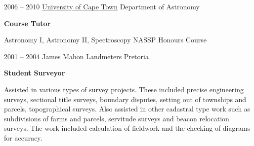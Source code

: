 \documentclass[]{friggeri-cv} %
\begin{document}
\begin{entrylist}
%
\entry
{2006 -- 2010}
{\href{http://www.uct.ac.za}{University of Cape Town}}
{Department of Astronomy}
{%
\textbf{Course Tutor}

Astronomy I, Astronomy II, Spectroscopy NASSP Honours Course
}
\end{entrylist}
\begin{entrylist}
%
\entry
{2001 -- 2004}
{\textcolor{maroonsblue}{James Mahon Landmeters}}
{Pretoria}
{%
\textbf{Student Surveyor}

Assisted in various types of survey projects. These included precise engineering surveys, sectional title surveys, boundary disputes, setting out of townships and parcels, topographical surveys. Also assisted in other cadastral type work such as subdivisions of farms and parcels, servitude surveys and beacon relocation surveys. The work included calculation of ﬁeldwork and the checking of diagrams for accuracy. 
}
\end{entrylist}
\pagebreak

\end{document}
